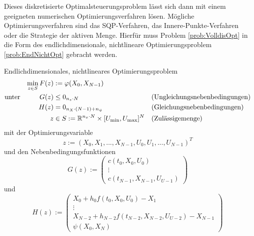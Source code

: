 Dieses diskretisierte Optimalsteuerungsproblem lässt sich dann mit einem geeigneten numerischen Optimierungsverfahren lösen. Mögliche Optimierungsverfahren sind das SQP-Verfahren, das Innere-Punkte-Verfahren oder die Strategie der aktiven Menge. Hierfür muss Problem \ref{prob:VolldisOpt} in die Form des endlichdimensionale, nichtlineare Optimierungsproblem \ref{prob:EndNichtOpt} gebracht werden.

\begin{problem}\label{prob:EndNichtOpt}
Endlichdimensionales, nichtlineares Optimierungsproblem
\begin{align*}
\min_{z \in S} F(z) &:= \varphi(X_0,X_{N-1}) & & \\
\text{unter} \hspace{10mm} G(z) &\leq 0_{n_s \cdot N} & &  \text{(Ungleichungsnebenbedingungen)} \\
H(z) &= 0_{n_X \cdot (N-1) + n_{\psi}} & & \text{(Gleichungsnebenbedingungen)}\\
z &\in S := \R^{n_x \cdot N} \times [U_{\min},U_{\max}]^{N} & &  \text{(Zulässigemenge)}
\end{align*}
mit der Optimierungsvariable
\begin{equation}
z := (X_0,X_1,...,X_{N-1},U_0,U_1,...,U_{N-1})^T
\end{equation}
und den Nebenbedingungsfunktionen 
\begin{equation}
G(z) := \begin{pmatrix}
c(t_0,X_0,U_0) \\ 
\vdots \\ 
c(t_{N-1},X_{N-1},U_{U-1})
\end{pmatrix} 
\end{equation}
und
\begin{equation}
H(z) := \begin{pmatrix}
X_0 + h_0 f(t_0,X_0,U_0) - X_1 \\ 
\vdots \\ 
X_{N-2} + h_{N-2} f(t_{N-2},X_{N-2},U_{U-2}) - X_{N-1} \\
\psi(X_0,X_N)
\end{pmatrix} 
\end{equation}
\end{problem}





















